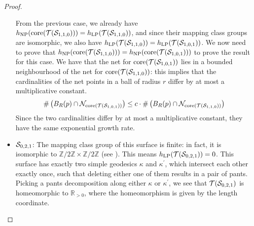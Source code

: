 \documentclass[12pt, reqno]{amsart}
\begin{document}
\begin{proof}
\begin{itemize}
    From the previous case, we already have $h_{\mathrm{NP}}(\mathrm{core}(\mathcal{T}(\mathcal{S}_{1,1,0}))) = h_{\mathrm{LP}}(\mathcal{T}(\mathcal{S}_{1,1,0}))$, and since their mapping class groups are isomorphic, we also have $h_{\mathrm{LP}}(\mathcal{T}(\mathcal{S}_{1,1,0})) = h_{\mathrm{LP}}(\mathcal{T}(\mathcal{S}_{1,0,1}))$.
    We now need to prove that $h_{\mathrm{NP}}(\mathrm{core}(\mathcal{T}(\mathcal{S}_{1,1,0}))) = h_{\mathrm{NP}}(\mathrm{core}(\mathcal{T}(\mathcal{S}_{1,0,1})))$ to prove the result for this case.
    We have that the net for $\mathrm{core}(\mathcal{T}(\mathcal{S}_{1,0,1}))$ lies in a bounded neighbourhood of the net for $\mathrm{core}(\mathcal{T}(\mathcal{S}_{1,1,0}))$: this implies that the cardinalities of the net points in a ball of radius $r$ differ by at most a multiplicative constant.
    \begin{align*}
      \#\left( B_R(p) \cap \mathcal{N}_{\mathrm{core}(\mathcal{T}(\mathcal{S}_{1,0,1}))} \right) \leq c \cdot \#\left( B_R(p) \cap \mathcal{N}_{\mathrm{core}(\mathcal{T}(\mathcal{S}_{1,1,0}))} \right)
    \end{align*}
    Since the two cardinalities differ by at most a multiplicative constant, they have the same exponential growth rate.
  \item $\mathcal{S}_{0,2,1}$: The mapping class group of this surface is finite: in fact, it is isomorphic to $\mathbb{Z}/2\mathbb{Z} \times \mathbb{Z}/2\mathbb{Z}$ (see \textcite{gendulphe2017whats}).
    This means $h_{\mathrm{LP}}(\mathcal{T}(\mathcal{S}_{0,2,1})) = 0$.
    This surface has exactly two simple geodesics $\kappa$ and $\kappa^{\prime}$, which intersect each other exactly once, such that deleting either one of them results in a pair of pants.
    Picking a pants decomposition along either $\kappa$ or $\kappa^{\prime}$, we see that $\mathcal{T}(\mathcal{S}_{0,2,1})$ is homeomorphic to $\mathbb{R}_{>0}$, where the homeomorphism is given by the length coordinate.


\end{itemize}
\end{proof}
\end{document}
